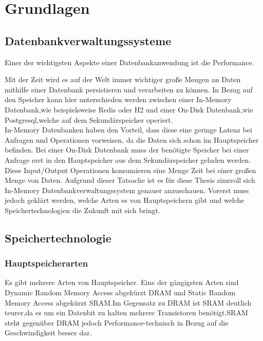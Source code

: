 \chapter{Grundlagen}

\section{Datenbankverwaltungssysteme}

Einer der wichtigsten Aspekte einer Datenbankanwendung ist die Performance. 

Mit der Zeit wird es auf der Welt immer wichtiger große Mengen an Daten mithilfe einer Datenbank persistieren und verarbeiten zu können.
In Bezug auf den Speicher kann hier unterschieden werden zwischen einer In-Memory Datenbank,wie beispielsweise Redis oder H2 und einer On-Disk Datenbank,wie Postgresql,welche auf dem Sekundärspeicher operiert. \\

In-Memory Datenbanken haben den Vorteil, dass diese eine geringe Latenz bei Anfragen und Operationen vorweisen, da die Daten sich schon im Hauptspeicher befinden. Bei einer On-Disk Datenbank muss der benötigte Speicher bei einer Anfrage erst in den Hauptspeicher aus dem Sekundärspeicher geladen werden. Diese Input/Output Operationen konsumieren eine Menge Zeit bei einer großen Menge von Daten.\cite{KABAKUS2017520}
Aufgrund dieser Tatsache ist es für diese Thesis sinnvoll sich In-Memory Datenbankverwaltungssystem genauer anzuschauen. 
Vorerst muss jedoch geklärt werden, welche Arten es von Hauptspeichern gibt und welche Speichertechnologien die Zukunft mit sich bringt.

\section{Speichertechnologie}

\subsection{Hauptspeicherarten}

Es gibt mehrere Arten von Hauptspeicher. Eine der gängigsten Arten sind Dynamic Random Memory Access abgekürzt DRAM und Static Random Memory Access abgekürzt SRAM.Im Gegensatz zu DRAM ist SRAM deutlich teurer,da es um ein Datenbit zu halten mehrere Transistoren benötigt.SRAM steht gegenüber DRAM jedoch Performance-technisch in Bezug auf die Geschwindigkeit besser dar.\cite{techtarget:Ram}

